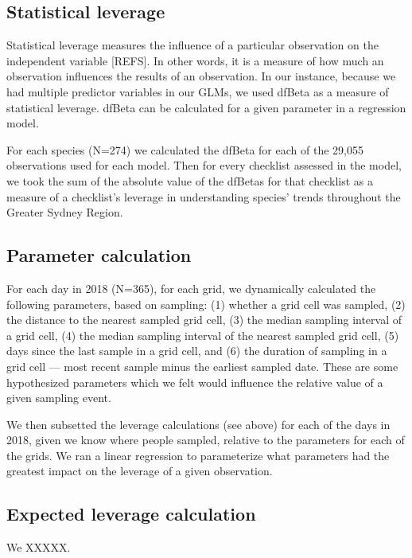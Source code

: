 \documentclass[9pt,twocolumn,twoside,lineno]{pnas-new}
\begin{document}
{\subsection*{Statistical leverage} Statistical leverage measures the influence of a particular observation on the independent variable [REFS]. In other words, it is a measure of how much an observation influences the results of an observation. In our instance, because we had multiple predictor variables in our GLMs, we used dfBeta as a measure of statistical leverage. dfBeta can be calculated for a given parameter in a regression model.

For each species (N=274) we calculated the dfBeta for each of the 29,055 observations used for each model. Then for every checklist assessed in the model, we took the sum of the absolute value of the dfBetas for that checklist as a measure of a checklist's leverage in understanding species' trends throughout the Greater Sydney Region.

\subsection*{Parameter calculation} For each day in 2018 (N=365), for each grid, we dynamically calculated the following parameters, based on sampling: (1) whether a grid cell was sampled, (2) the distance to the nearest sampled grid cell, (3) the median sampling interval of a grid cell, (4) the median sampling interval of the nearest sampled grid cell, (5) days since the last sample in a grid cell, and (6) the duration of sampling in a grid cell --- most recent sample minus the earliest sampled date. These are some hypothesized parameters which we felt would influence the relative value of a given sampling event.

We then subsetted the leverage calculations (see above) for each of the days in 2018, given we know where people sampled, relative to the parameters for each of the grids. We ran a linear regression to parameterize what parameters had the greatest impact on the leverage of a given observation.

\subsection*{Expected leverage calculation} We XXXXX.


}

\showmatmethods{} %


\showacknow{} %


\end{document}
